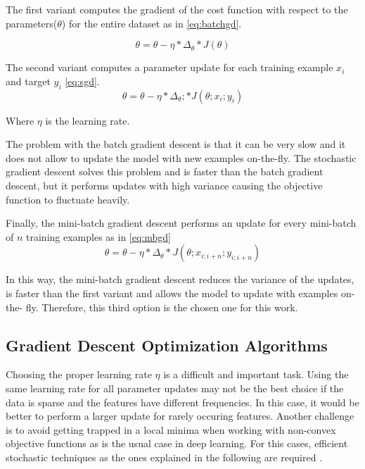 The first variant computes the gradient of the cost function with respect to the parameters($\theta$) for the entire dataset as in \ref{eq:batchgd}.

\begin{equation} \label{eq:batchgd}
\theta=\theta-\eta * \Delta_\theta * J(\theta)
\end{equation}

The second variant computes a parameter update for each training example $x_i$ and target $y_i$ \ref{eq:sgd}.
\begin{equation} \label{eq:sgd}
\theta=\theta-\eta * \Delta_\theta; * J(\theta;x_i;y_i)
\end{equation}

Where $\eta$ is the learning rate.

The problem with the batch gradient descent is that it can be very slow and it does not allow to update the model with new examples on-the-fly. The stochastic gradient descent solves this problem and is faster than the batch gradient descent, but it performs updates with high variance causing the objective function to fluctuate heavily.  

Finally, the mini-batch gradient descent performs an update for every mini-batch of $n$ training examples as in \ref{eq:mbgd} \begin{equation} \label{eq:mbgd}
\theta=\theta-\eta * \Delta_\theta * J(\theta;x_{i:i+n};y_{i:i+n})
\end{equation}

In this way, the mini-batch gradient descent reduces the variance of the updates, is faster than the first variant and allows the model to update with examples on-the- fly. Therefore, this third option is the chosen one for this work\cite{ruder2016overview}. 

\subsection{Gradient Descent Optimization Algorithms}
Choosing the proper learning rate $\eta$ is a difficult and important task. Using the same learning rate for all parameter updates may not be the best choice if the data is sparse and the features have different frequencies. In this case, it would be better to perform a larger update for rarely occuring features. Another challenge is to avoid getting trapped in a local minima when working with non-convex objective functions as is the usual case in deep learning. For this cases, efficient stochastic techniques as the ones explained in the following are required \cite{ruder2016overview}.

